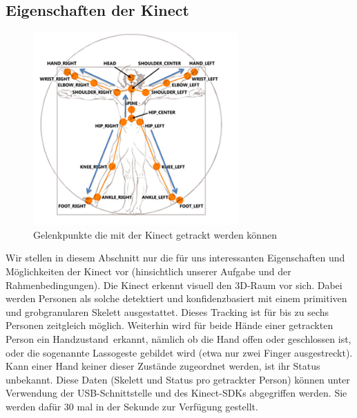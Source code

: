 \subsection{Eigenschaften der Kinect} 
\begin{figure}[htbp] 
  \centering
     \includegraphics[width=0.7\textwidth]{skeletal.png}
  \caption{Gelenkpunkte die mit der Kinect getrackt werden können}
  \label{fig:Bild1}
\end{figure}
\cite{skeletal}
	Wir stellen in diesem Abschnitt nur die für uns interessanten Eigenschaften und Möglichkeiten der Kinect vor (hinsichtlich unserer Aufgabe und der Rahmenbedingungen). Die Kinect erkennt visuell den 3D-Raum vor sich. Dabei werden Personen als solche detektiert und konfidenzbasiert mit einem primitiven und grobgranularen Skelett ausgestattet. Dieses Tracking ist für bis zu sechs Personen zeitgleich möglich. Weiterhin wird für beide Hände einer getrackten Person ein \glqq Handzustand\grqq~erkannt, nämlich ob die Hand offen oder geschlossen ist, oder die sogenannte Lassogeste gebildet wird (etwa nur zwei Finger ausgestreckt). Kann einer Hand keiner dieser Zustände zugeordnet werden, ist ihr Status unbekannt. Diese Daten (Skelett und Status pro getrackter Person) können unter Verwendung der USB-Schnittstelle und des Kinect-SDKs abgegriffen werden. Sie werden dafür 30 mal in der Sekunde zur Verfügung gestellt.